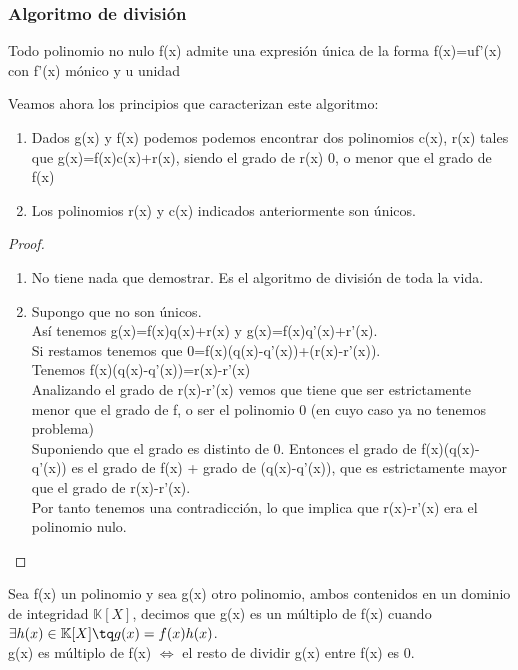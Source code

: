 \documentclass[nochap]{apuntes}
\begin{document}
\subsubsection{Algoritmo de división}
\begin{lemma}
 Todo polinomio no nulo f(x) admite una expresión única de la forma f(x)=uf'(x) con f'(x) mónico y u unidad
\end{lemma}
Veamos ahora los principios que caracterizan este algoritmo:
\begin{enumerate}
 \item Dados g(x) y f(x) podemos podemos encontrar dos polinomios c(x), r(x) tales que g(x)=f(x)c(x)+r(x), siendo el grado de r(x) 0, o menor que el grado de f(x)
 \item Los polinomios r(x) y c(x) indicados anteriormente son únicos.
 \end{enumerate}
\begin{proof}
 \begin{enumerate}
  \item No tiene nada que demostrar. Es el algoritmo de división de toda la vida.
  \item Supongo que no son únicos.\\
  Así tenemos g(x)=f(x)q(x)+r(x) y g(x)=f(x)q'(x)+r'(x).\\
  Si restamos tenemos que 0=f(x)(q(x)-q'(x))+(r(x)-r'(x)).\\
  Tenemos f(x)(q(x)-q'(x))=r(x)-r'(x)\\
  Analizando el grado de r(x)-r'(x) vemos que tiene que ser estrictamente menor que el grado de f, o ser el polinomio 0 (en cuyo caso
  ya no tenemos problema)\\
  Suponiendo que el grado es distinto de 0. Entonces el grado de f(x)(q(x)-q'(x)) es el grado de f(x) + grado de (q(x)-q'(x)), que es estrictamente
  mayor que el grado de r(x)-r'(x).\\
  Por tanto tenemos una contradicción, lo que implica que r(x)-r'(x) era el polinomio nulo.  
 \end{enumerate}
\end{proof}
\begin{defn}
 Sea f(x) un polinomio y sea g(x) otro polinomio, ambos contenidos en un dominio de integridad $\mathbb{K}[X]$, decimos
 que g(x) es un múltiplo de f(x) cuando $\exists h(x)\in \mathbb{K}[X] \tq g(x)=f(x)h(x)$.\\
 g(x) es múltiplo de f(x) $\Leftrightarrow$  el resto de dividir g(x) entre f(x) es 0.
\end{defn}
\end{document}
